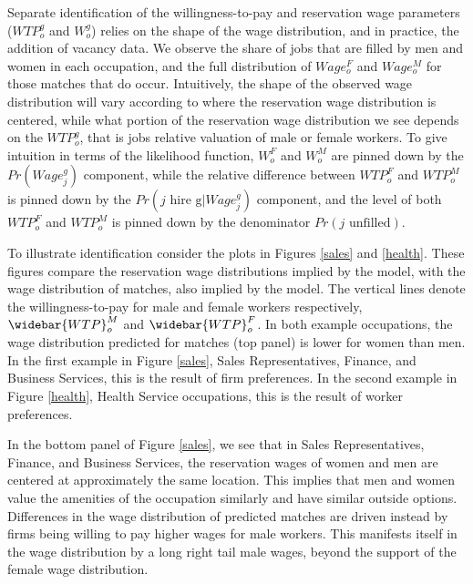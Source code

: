 \documentclass[11pt]{article}
\begin{document}
Separate identification of the willingness-to-pay and reservation wage parameters ($WTP^g_o$ and $W^g_o$) relies on the shape of the wage distribution, and in practice, the addition of vacancy data. We observe the share of jobs that are filled by men and women in each occupation, and the full distribution of $Wage^F_o$ and $Wage^M_o$ for those matches that do occur. Intuitively, the shape of the observed wage distribution will vary according to where the reservation wage distribution is centered, while what portion of the reservation wage distribution we see depends on the $WTP^g_o$, that is jobs relative valuation of male or female workers. To give intuition in terms of the likelihood function, $W^F_{o}$ and $W^M_{o}$ are pinned down by the $Pr(Wage^g_{j})$ component, while the relative difference between $WTP^F_o$ and $WTP^M_o$ is pinned down by the $Pr(\text{$j$ hire g} | Wage^g_{j} ) $ component, and the level of both $WTP^F_o$ and $WTP^M_o$ is pinned down by the denominator $Pr(\text{$j$ unfilled})$.

To illustrate identification consider the plots in Figures \ref{sales} and \ref{health}. These figures compare the reservation wage distributions implied by the model, with the wage distribution of matches, also implied by the model. The vertical lines denote the willingness-to-pay for male and female workers respectively, $\widebar{WTP}^M_{o}$ and $\widebar{WTP}^F_{o}$. In both example occupations, the wage distribution predicted for matches (top panel) is lower for women than men. In the first example in Figure \ref{sales}, Sales Representatives, Finance, and Business Services, this is the result of firm preferences. In the second example in Figure \ref{health}, Health Service occupations, this is the result of worker preferences.

In the bottom panel of Figure \ref{sales}, we see that in Sales Representatives, Finance, and Business Services, the reservation wages of women and men are centered at approximately the same location. This implies that men and women value the amenities of the occupation similarly and have similar outside options. Differences in the wage distribution of predicted matches are driven instead by firms being willing to pay higher wages for male workers. This manifests itself in the wage distribution by a long right tail male wages, beyond the support of the female wage distribution. 

\end{document}
